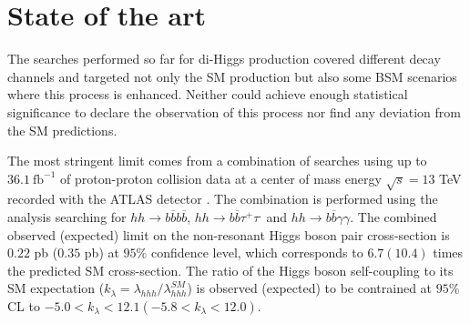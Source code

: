 
\section{State of the art}
\label{sec:backg}


The searches performed so far for di-Higgs production covered different decay channels and targeted not only the SM production but also some BSM scenarios where this process is enhanced. Neither could achieve enough statistical significance to declare the observation of this process nor find any deviation from the SM predictions. 

The most stringent limit comes from a combination of searches using up to $36.1~\text{fb}^{-1}$ of proton-proton collision data at a center of mass energy $\sqrt{s}=13$ TeV recorded with the ATLAS detector \cite{ATLAShhComb}. The combination is performed using the analysis searching for $hh\rightarrow b\overline{b}b\overline{b}$, $hh\rightarrow b\overline{b}\tau^+\tau^.$ and $hh\rightarrow b\overline{b}\gamma\gamma$. The combined observed (expected) limit on the non-resonant Higgs boson pair cross-section is $0.22$ pb ($0.35$ pb) at $95\%$ confidence level, which corresponds to $6.7 (10.4)$ times the predicted SM cross-section. The ratio of the Higgs boson self-coupling to its SM expectation ($k_{\lambda}=\lambda_{hhh}/\lambda_{hhh}^{SM}$) is observed (expected) to be contrained at $95\%$ CL to $-5.0<k_{\lambda}<12.1 (-5.8<k_{\lambda}<12.0)$. 

